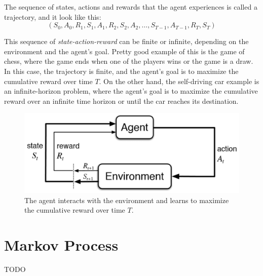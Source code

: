 The sequence of states, actions and rewards that the agent experiences is called a trajectory, and it look like this:
\begin{equation}
(S_0, A_0, R_1, S_1, A_1, R_2, S_2, A_2, \dots, S_{T-1}, A_{T-1}, R_T, S_T)
\end{equation}

This sequence of \emph{state-action-reward} can be finite or infinite, depending on the environment and the agent's goal.
Pretty good example of this is the game of chess, where the game ends when one of the players wins or the game is a draw.
In this case, the trajectory is finite, and the agent's goal is to maximize the cumulative reward over time $T$.
On the other hand, the self-driving car example is an infinite-horizon problem, where the agent's goal is to maximize the cumulative reward over an infinite time horizon or until the car reaches its destination.

\begin{figure}[h!]
    \includegraphics[width=0.8\linewidth]{image/agent-environment}
    \centering
    \caption{The agent interacts with the environment and learns to maximize the cumulative reward over time $T$.}
    \label{fig:rl-introduction}
\end{figure}


\section{Markov Process}\label{sec:markov-process}
TODO

%


